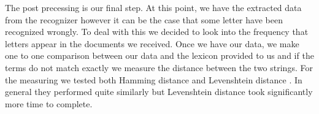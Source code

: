 The post precessing is our final step. At this point, we have the extracted data from the recognizer however it can be the case that some letter have been recognized wrongly. To deal with this we decided to look into the frequency that letters appear in the documents we received. Once we have our data, we make one to one comparison between our data and the lexicon provided to us and if the terms do not match exactly we measure the distance between the two strings. For the measuring we tested both Hamming distance \cite{norouzi2012hamming} and Levenshtein distance \cite{heeringa2004measuring}. In general they performed quite similarly but Levenshtein distance took significantly more time to complete.